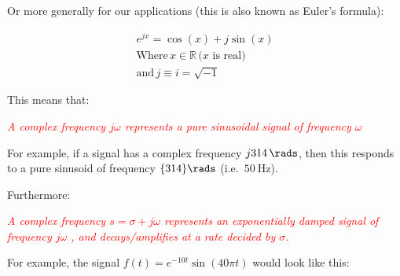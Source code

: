 \documentclass[
  12pt,
  a4paper,
]{report}
\newcommand{\redtext}[1]{\textcolor{red}{#1}}
\begin{document}
\label{de-moivre-formula-general}
Or more generally for our applications (this is also known as Euler's
formula):

\begin{gather}
    \label{eq:de-moivre-formula-general}
    e^{jx} = \cos(x) + j \sin(x) \\
    \text{Where} \, x \in \mathbb{R}\, \text{(\(x\) is real)} \\
    \text{and} \, j \equiv i = \sqrt{-1}
\end{gather}

\label{complex-sinusoid-def-1}
This means that:\\
\begin{mdframed}
    \begin{center}
        \redtext{\emph{A complex frequency \(j\omega \) represents a pure sinusoidal signal of frequency \(\omega \) \unit{\rads}}}
    \end{center}
\end{mdframed}

For example, if a signal has a complex frequency
\(\complexqty[output-complex-root=j, complex-root-position=before-number]{314i}{\rads}\),
then this responds to a pure sinusoid of frequency \(\qty{314}{\rads}\)
(i.e.~\(\qty{50}{\hertz}\)).

\label{exp-damped-sinusoid-def}
Furthermore:\\
\begin{mdframed}
    \begin{center}
        \redtext{\emph{A complex frequency \(s = \sigma + j\omega\) represents an exponentially damped signal of frequency \(j\omega\) \unit{\rads}, and decays/amplifies at a rate decided by \(\sigma\).}}
    \end{center}
\end{mdframed}

For example, the signal \(f(t) =  e^{-10t} \sin(40\pi t)\) would look
like this:
\end{document}
